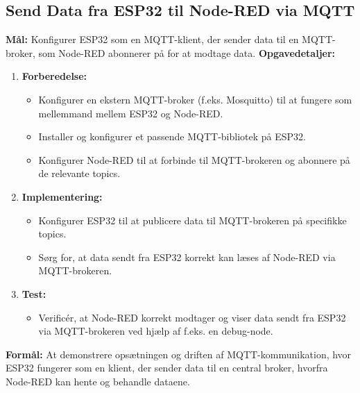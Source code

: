 \subsection*{Send Data fra ESP32 til Node-RED via MQTT}
\textbf{Mål:} Konfigurer ESP32 som en MQTT-klient, der sender data til en MQTT-broker, som Node-RED abonnerer på for at modtage data.
\newline\newline\noindent
\textbf{Opgavedetaljer:}
\begin{enumerate}
	\item \textbf{Forberedelse:}
	\begin{itemize}
		\item Konfigurer en ekstern MQTT-broker (f.eks. Mosquitto) til at fungere som mellemmand mellem ESP32 og Node-RED.
		\item Installer og konfigurer et passende MQTT-bibliotek på ESP32.
		\item Konfigurer Node-RED til at forbinde til MQTT-brokeren og abonnere på de relevante topics.
	\end{itemize}
	\item \textbf{Implementering:}
	\begin{itemize}
		\item Konfigurer ESP32 til at publicere data til MQTT-brokeren på specifikke topics.
		\item Sørg for, at data sendt fra ESP32 korrekt kan læses af Node-RED via MQTT-brokeren.
	\end{itemize}
	\item \textbf{Test:}
	\begin{itemize}
		\item Verificér, at Node-RED korrekt modtager og viser data sendt fra ESP32 via MQTT-brokeren ved hjælp af f.eks. en debug-node.
	\end{itemize}
\end{enumerate}
\textbf{Formål:} At demonstrere opsætningen og driften af MQTT-kommunikation, hvor ESP32 fungerer som en klient, der sender data til en central broker, hvorfra Node-RED kan hente og behandle dataene.

